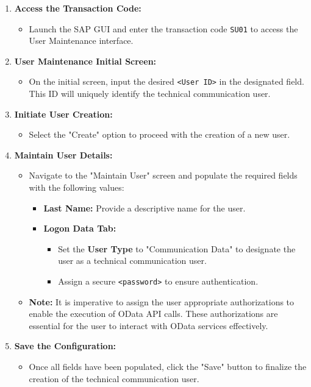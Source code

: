 \begin{enumerate}
    \item \textbf{Access the Transaction Code:}
    \begin{itemize}
        \item Launch the SAP GUI and enter the transaction code \texttt{SU01} to access the User Maintenance interface.
    \end{itemize}

    \item \textbf{User Maintenance Initial Screen:}
    \begin{itemize}
        \item On the initial screen, input the desired \texttt{<User ID>} in the designated field. This ID will uniquely identify the technical communication user.
    \end{itemize}

    \item \textbf{Initiate User Creation:}
    \begin{itemize}
        \item Select the "Create" option to proceed with the creation of a new user.
    \end{itemize}

    \item \textbf{Maintain User Details:}
    \begin{itemize}
        \item Navigate to the "Maintain User" screen and populate the required fields with the following values:
        \begin{itemize}
            \item \textbf{Last Name:} Provide a descriptive name for the user.
            \item \textbf{Logon Data Tab:}
            \begin{itemize}
                \item Set the \textbf{User Type} to "Communication Data" to designate the user as a technical communication user.
                \item Assign a secure \texttt{<password>} to ensure authentication.
            \end{itemize}
        \end{itemize}
        \item \textbf{Note:} It is imperative to assign the user appropriate authorizations to enable the execution of OData API calls. These authorizations are essential for the user to interact with OData services effectively.
    \end{itemize}

    \item \textbf{Save the Configuration:}
    \begin{itemize}
        \item Once all fields have been populated, click the "Save" button to finalize the creation of the technical communication user.
    \end{itemize}
\end{enumerate}

